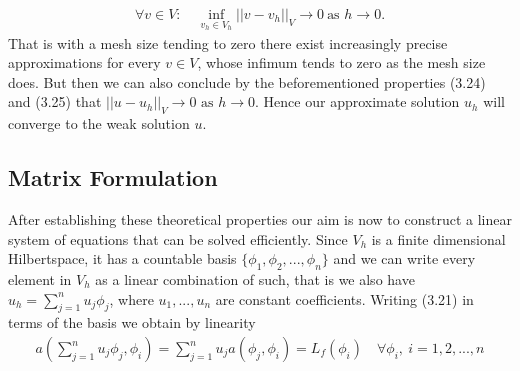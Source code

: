 \documentclass[fleqn, a4paper, 11pt, bibliography=totoc]{report}
\begin{document}
\begin{equation}
\begin{aligned}
\forall v \in V : \quad \inf_{v_h \in V_h} || v - v_h||_V \rightarrow 0 \ \text{as } h \rightarrow 0.
\end{aligned}
\end{equation}
That is with a mesh size tending to zero there exist increasingly precise approximations for every $v \in V$, whose infimum tends to zero as the mesh size does. But then we can also conclude by  the beforementioned properties (3.24) and (3.25) that $|| u - u_h||_V \rightarrow 0 \text{ as } h \rightarrow 0$. Hence our approximate solution $u_h$ will converge to the weak solution $u$. 

\subsection{Matrix Formulation}
After establishing these theoretical properties our aim is now to construct a linear system of equations that can be solved efficiently. Since $V_h$ is a finite dimensional Hilbertspace, it has a countable basis $\{\phi_1, \phi_2, ..., \phi_n \}$ and we can write every element in $V_h$ as a linear combination of such, that is we also have $u_h = \sum_{j=1}^{n} u_j \phi_j$, where $u_1, ..., u_n$ are constant coefficients. Writing (3.21) in terms of the basis we obtain by linearity
\begin{equation}
\begin{aligned}
a(\sum_{j=1}^{n} u_j \phi_j, \phi_i) = \sum_{j=1}^{n} u_j a(\phi_j, \phi_i) = L_f(\phi_i) \quad \forall \phi_i, \ i = 1, 2, ..., n 
\end{aligned}
\end{equation}
\end{document}
